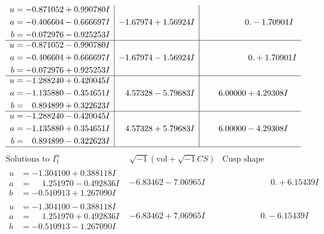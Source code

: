 \documentclass[1p]{elsarticle_modified}
\theoremstyle{definition}
\newcommand{\I}{\sqrt{-1}}
\begin{document}
$$\begin{array}{c|c|c}
\begin{aligned}
u &= -0.871052 + 0.990780 I \\
a &= -0.406604 - 0.666697 I \\
b &= -0.072976 - 0.925253 I\end{aligned}
 & -1.67974 + 1.56924 I & \phantom{-0.000000 } 0. - 1.70901 I \\ \hline\begin{aligned}
u &= -0.871052 - 0.990780 I \\
a &= -0.406604 + 0.666697 I \\
b &= -0.072976 + 0.925253 I\end{aligned}
 & -1.67974 - 1.56924 I & \phantom{-0.000000 -}0. + 1.70901 I \\ \hline\begin{aligned}
u &= -1.288240 + 0.420045 I \\
a &= -1.135880 - 0.354651 I \\
b &= \phantom{-}0.894899 + 0.322623 I\end{aligned}
 & \phantom{-}4.57328 - 5.79683 I & \phantom{-}6.00000 + 4.29308 I \\ \hline\begin{aligned}
u &= -1.288240 - 0.420045 I \\
a &= -1.135880 + 0.354651 I \\
b &= \phantom{-}0.894899 - 0.322623 I\end{aligned}
 & \phantom{-}4.57328 + 5.79683 I & \phantom{-}6.00000 - 4.29308 I\\
 \hline 
 \end{array}$$\newpage$$\begin{array}{c|c|c}  
\text{Solutions to }I^u_{1}& \I (\text{vol} + \sqrt{-1}CS) & \text{Cusp shape}\\
 \hline 
\begin{aligned}
u &= -1.304100 + 0.388118 I \\
a &= \phantom{-}1.251970 - 0.492836 I \\
b &= -0.510913 + 1.267090 I\end{aligned}
 & -6.83462 - 7.06965 I & \phantom{-0.000000 -}0. + 6.15439 I \\ \hline\begin{aligned}
u &= -1.304100 - 0.388118 I \\
a &= \phantom{-}1.251970 + 0.492836 I \\
b &= -0.510913 - 1.267090 I\end{aligned}
 & -6.83462 + 7.06965 I & \phantom{-0.000000 } 0. - 6.15439 I \\ \hline\begin{aligned}

\end{aligned}
\end{array}$$
\end{document}

